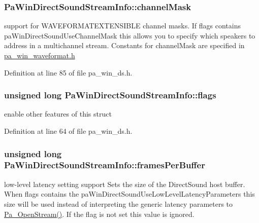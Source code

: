 \subsubsection[{\texorpdfstring{channel\+Mask}{channelMask}}]{ Pa\+Win\+Direct\+Sound\+Stream\+Info\+::channel\+Mask}\hypertarget{struct_pa_win_direct_sound_stream_info_aa9282b945c2331e1dd3f13b64fa7e927}{}\label{struct_pa_win_direct_sound_stream_info_aa9282b945c2331e1dd3f13b64fa7e927}
support for W\+A\+V\+E\+F\+O\+R\+M\+A\+T\+E\+X\+T\+E\+N\+S\+I\+B\+LE channel masks. If flags contains pa\+Win\+Direct\+Sound\+Use\+Channel\+Mask this allows you to specify which speakers to address in a multichannel stream. Constants for channel\+Mask are specified in \hyperlink{pa__win__waveformat_8h}{pa\+\_\+win\+\_\+waveformat.\+h} 

Definition at line 85 of file pa\+\_\+win\+\_\+ds.\+h.

\subsubsection[{\texorpdfstring{flags}{flags}}]{\setlength{\rightskip}{0pt plus 5cm}unsigned long Pa\+Win\+Direct\+Sound\+Stream\+Info\+::flags}\hypertarget{struct_pa_win_direct_sound_stream_info_a72f9dcac1303ba51fd1e36965a7cda46}{}\label{struct_pa_win_direct_sound_stream_info_a72f9dcac1303ba51fd1e36965a7cda46}
enable other features of this struct 

Definition at line 64 of file pa\+\_\+win\+\_\+ds.\+h.

\subsubsection[{\texorpdfstring{frames\+Per\+Buffer}{framesPerBuffer}}]{\setlength{\rightskip}{0pt plus 5cm}unsigned long Pa\+Win\+Direct\+Sound\+Stream\+Info\+::frames\+Per\+Buffer}\hypertarget{struct_pa_win_direct_sound_stream_info_adb9fc9098994e07ac7e1e7e9ac2175d7}{}\label{struct_pa_win_direct_sound_stream_info_adb9fc9098994e07ac7e1e7e9ac2175d7}
low-\/level latency setting support Sets the size of the Direct\+Sound host buffer. When flags contains the pa\+Win\+Direct\+Sound\+Use\+Low\+Level\+Latency\+Parameters this size will be used instead of interpreting the generic latency parameters to \hyperlink{portaudio_8h_a443ad16338191af364e3be988014cbbe}{Pa\+\_\+\+Open\+Stream()}. If the flag is not set this value is ignored.


